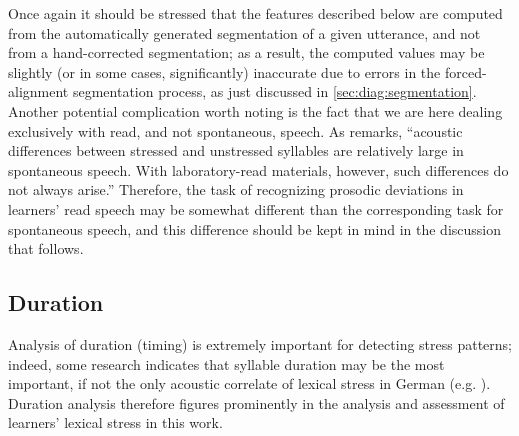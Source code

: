 Once again it should be stressed that the features described below are computed from the automatically generated segmentation of a given utterance, and not from a hand-corrected segmentation; as a result, the computed values may be slightly (or in some cases, significantly) inaccurate due to errors in the forced-alignment segmentation process, as just discussed in \cref{sec:diag:segmentation}. %
	Another potential complication worth noting is the fact that we are here dealing exclusively with read, and not spontaneous, speech. As \textcite[p.~275]{Cutler2005} remarks, ``acoustic differences between stressed and unstressed syllables are relatively large in spontaneous speech. With laboratory-read materials, however, such differences do not always arise.'' Therefore, the task of recognizing prosodic deviations in learners' read speech may be somewhat different than the corresponding task for spontaneous speech, and this difference should be kept in mind in the discussion that follows.

	\subsection{Duration}
	\label{sec:prosody:duration}

	Analysis of duration (timing) is extremely important for detecting stress patterns;
indeed, some research indicates that syllable duration may be the most important, if not the only acoustic correlate of lexical stress in German (e.g. \cite{Dogil1999}).
Duration analysis therefore figures prominently in the analysis and assessment of learners' lexical stress in this work. 


